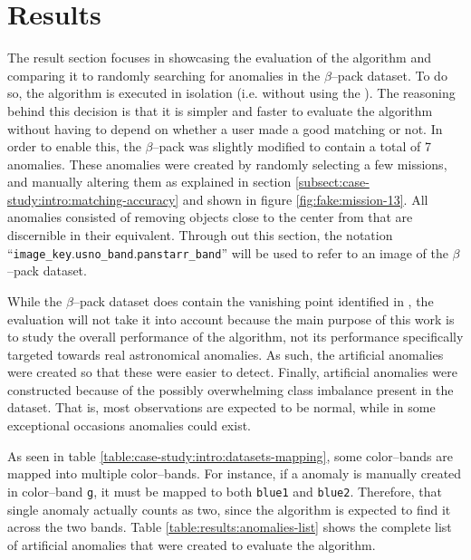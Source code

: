 \section{Results} \label{sect:case-study:results}

The result section focuses in showcasing the evaluation of the \mlblink algorithm and comparing it to randomly searching for anomalies in the $\beta$--pack dataset. To do so, the \mlblink algorithm is executed in isolation (i.e. without using the \mlblinkui). The reasoning behind this decision is that it is simpler and faster to evaluate the algorithm without having to depend on whether a user made a good matching or not. In order to enable this, the $\beta$--pack was slightly modified to contain a total of 7 anomalies. These anomalies were created by randomly selecting a few missions, and manually altering them as explained in section \ref{subsect:case-study:intro:matching-accuracy} and shown in figure \ref{fig:fake:mission-13}. All anomalies consisted of removing objects close to the center from \panstarrs that are discernible in their \usno equivalent. Through out this section, the notation ``\texttt{image\_key}.\texttt{usno\_band}.\texttt{panstarr\_band}'' will be used to refer to an image of the $\beta$--pack dataset. \newline

While the $\beta$--pack dataset does contain the vanishing point identified in \cite{article:our-sky}, the evaluation will not take it into account because the main purpose of this work is to study the overall performance of the \mlblink algorithm, not its performance specifically targeted towards real astronomical anomalies. As such, the artificial anomalies were created so that these were easier to detect. Finally, artificial anomalies were constructed because of the possibly overwhelming class imbalance present in the dataset. That is, most observations are expected to be normal, while in some exceptional occasions anomalies could exist. \newline

As seen in table \ref{table:case-study:intro:datasets-mapping}, some \panstarrs color--bands are mapped into multiple \usno color--bands. For instance, if a \panstarrs anomaly is manually created in color--band \texttt{g}, it must be mapped to both \usno \texttt{blue1} and \texttt{blue2}. Therefore, that single anomaly actually counts as two, since the \mlblink algorithm is expected to find it across the two \usno bands. Table \ref{table:results:anomalies-list} shows the complete list of artificial anomalies that were created to evaluate the algorithm. \newline

